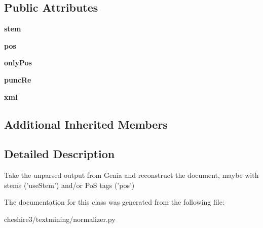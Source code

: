 \subsection*{Public Attributes}
\begin{DoxyCompactItemize}
\item 
\hypertarget{classcheshire3_1_1textmining_1_1normalizer_1_1_reconstruct_genia_normalizer_ac4778e530ab2321f33427916c316b3d2}{{\bfseries stem}}\label{classcheshire3_1_1textmining_1_1normalizer_1_1_reconstruct_genia_normalizer_ac4778e530ab2321f33427916c316b3d2}

\item 
\hypertarget{classcheshire3_1_1textmining_1_1normalizer_1_1_reconstruct_genia_normalizer_a8abf9bd1c6d02b7a3bcf85e086cc3db6}{{\bfseries pos}}\label{classcheshire3_1_1textmining_1_1normalizer_1_1_reconstruct_genia_normalizer_a8abf9bd1c6d02b7a3bcf85e086cc3db6}

\item 
\hypertarget{classcheshire3_1_1textmining_1_1normalizer_1_1_reconstruct_genia_normalizer_a620b4bda02d241b3a16321b85d90c973}{{\bfseries only\-Pos}}\label{classcheshire3_1_1textmining_1_1normalizer_1_1_reconstruct_genia_normalizer_a620b4bda02d241b3a16321b85d90c973}

\item 
\hypertarget{classcheshire3_1_1textmining_1_1normalizer_1_1_reconstruct_genia_normalizer_a5980fccb0c872386f4e291fafb372c54}{{\bfseries punc\-Re}}\label{classcheshire3_1_1textmining_1_1normalizer_1_1_reconstruct_genia_normalizer_a5980fccb0c872386f4e291fafb372c54}

\item 
\hypertarget{classcheshire3_1_1textmining_1_1normalizer_1_1_reconstruct_genia_normalizer_a5a99697be335e12a6dba81ead729d54c}{{\bfseries xml}}\label{classcheshire3_1_1textmining_1_1normalizer_1_1_reconstruct_genia_normalizer_a5a99697be335e12a6dba81ead729d54c}

\end{DoxyCompactItemize}
\subsection*{Additional Inherited Members}


\subsection{Detailed Description}
\begin{DoxyVerb}Take the unparsed output from Genia and reconstruct the document, maybe with stems ('useStem') and/or PoS tags ('pos') \end{DoxyVerb}
 

The documentation for this class was generated from the following file\-:\begin{DoxyCompactItemize}
\item 
cheshire3/textmining/normalizer.\-py\end{DoxyCompactItemize}
